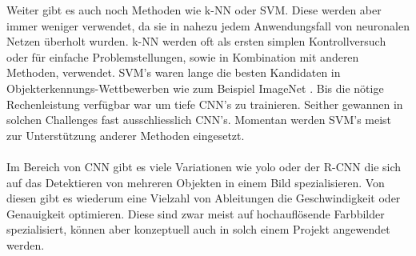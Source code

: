 Weiter gibt es auch noch Methoden wie \gls{k-NN} oder \gls{SVM}. Diese werden aber immer weniger verwendet, da sie in nahezu jedem Anwendungsfall von neuronalen Netzen überholt wurden. \gls{k-NN} werden oft als ersten simplen Kontrollversuch oder für einfache Problemstellungen, sowie in Kombination mit anderen Methoden, verwendet. \gls{SVM}'s waren lange die besten Kandidaten in Objekterkennungs-Wettbewerben wie zum Beispiel ImageNet \parencite{ILSVRC15}. Bis die nötige Rechenleistung verfügbar war um tiefe \gls{CNN}'s zu trainieren. Seither gewannen in solchen Challenges fast ausschliesslich \gls{CNN}'s. Momentan werden \gls{SVM}'s meist zur Unterstützung anderer Methoden eingesetzt.\\
\\
Im Bereich von \gls{CNN} gibt es viele Variationen wie \gls{yolo} oder der \gls{R-CNN} \parencite{yoloRCnn} die sich auf das Detektieren von mehreren Objekten in einem Bild spezialisieren. Von diesen gibt es wiederum eine Vielzahl von Ableitungen die Geschwindigkeit oder Genauigkeit optimieren. Diese sind zwar meist auf hochauflösende Farbbilder spezialisiert, können aber konzeptuell auch in solch einem Projekt angewendet werden.

